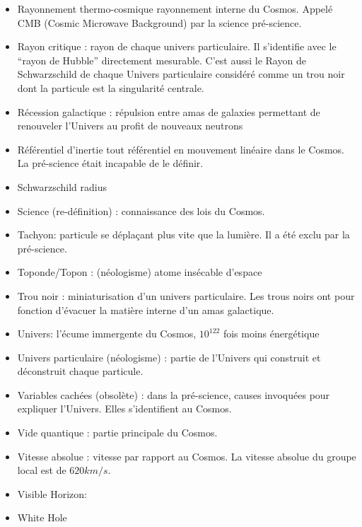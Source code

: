 \documentclass[a4paper,12pt]{article}
\begin{document}
\begin{appendix}
\begin{itemize}
\item Rayonnement thermo-cosmique rayonnement interne du Cosmos. Appelé CMB (Cosmic Microwave Background) par la science pré-science.
\item Rayon critique : rayon de chaque univers particulaire. Il s’identifie avec le ``rayon de Hubble'' directement mesurable. C’est aussi le Rayon de Schwarzschild de chaque Univers particulaire considéré comme un trou noir dont la particule est la singularité centrale.
\item Récession galactique : répulsion entre amas de galaxies permettant de renouveler l’Univers au profit de nouveaux neutrons
\item Référentiel d’inertie tout référentiel en mouvement linéaire dans le Cosmos. La pré-science était incapable de le définir.
\item Schwarzschild radius
\item Science (re-définition) : connaissance des lois du Cosmos.
\item Tachyon: particule se déplaçant plus vite que la lumière. Il a été exclu par la pré-science.
\item Toponde/Topon : (néologisme) atome insécable d’espace
\item Trou noir : miniaturisation d’un univers particulaire. Les trous noirs ont pour fonction d’évacuer la matière interne d’un amas galactique.
\item Univers: l'écume immergente du Cosmos, $10^{122}$ fois moins énergétique
\item Univers particulaire (néologisme) : partie de l’Univers qui construit et déconstruit chaque particule.
\item Variables cachées (obsolète) : dans la pré-science, causes invoquées pour expliquer l’Univers. Elles s’identifient au Cosmos.
\item Vide quantique : partie principale du Cosmos.
\item Vitesse absolue : vitesse par rapport au Cosmos. La vitesse absolue du groupe local est de $620 km/s$.
\item Visible Horizon:
\item White Hole
\end{itemize}


\listoftables{}   %
\listoffigures{}



\end{appendix}
\end{document}
